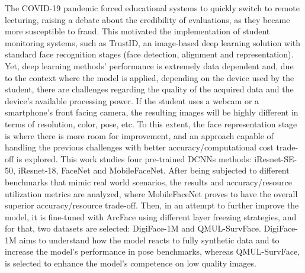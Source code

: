 \documentclass[class=report, crop=false, a4paper, 12pt]{standalone}
\begin{document}
\par The COVID-19 pandemic forced educational systems to quickly switch to remote lecturing, raising a debate about the credibility of evaluations, as they became more susceptible to fraud. This motivated the implementation of student monitoring systems, such as TrustID, an image-based deep learning solution with standard face recognition stages (face detection, alignment and representation). Yet, deep learning methods' performance is extremely data dependent and, due to the context where the model is applied, depending on the device used by the student, there are challenges regarding the quality of the acquired data and the device's available processing power. If the student uses a webcam or a smartphone's front facing camera, the resulting images will be highly different in terms of resolution, color, pose, etc. To this extent, the face representation stage is where there is more room for improvement, and an approach capable of handling the previous challenges with better accuracy/computational cost trade-off is explored. This work studies four pre-trained \gls{DCNNs} methods: iResnet-SE-50, iResnet-18, FaceNet and MobileFaceNet. After being subjected to different benchmarks that mimic real world scenarios, the results and accuracy/resource utilization metrics are analyzed, where MobileFaceNet proves to have the overall superior accuracy/resource trade-off. Then, in an attempt to further improve the model, it is fine-tuned with ArcFace using different layer freezing strategies, and for that, two datasets are selected: DigiFace-1M and QMUL-SurvFace. DigiFace-1M aims to understand how the model reacts to fully synthetic data and to increase the model's performance in pose benchmarks, whereas QMUL-SurvFace, is selected to enhance the model's competence on low quality images.
\end{document}
